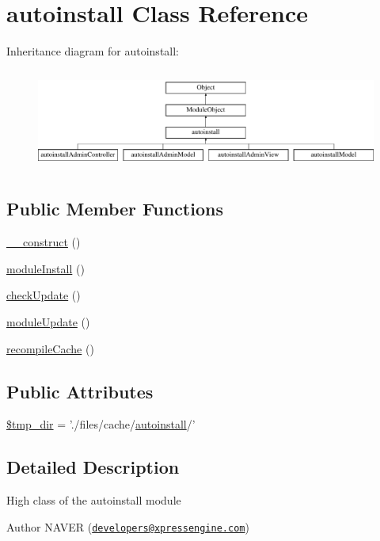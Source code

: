 \hypertarget{classautoinstall}{\section{autoinstall Class Reference}
\label{classautoinstall}
}
Inheritance diagram for autoinstall\-:\begin{figure}[H]
\begin{center}
\leavevmode
\includegraphics[height=3.353293cm]{classautoinstall}
\end{center}
\end{figure}
\subsection*{Public Member Functions}
\begin{DoxyCompactItemize}
\item 
\hyperlink{classautoinstall_af9f001cf682c80b258e5c2bbe8605b86}{\-\_\-\-\_\-construct} ()
\item 
\hyperlink{classautoinstall_ad783aa6031577dca5fdcc7f6ea61f452}{module\-Install} ()
\item 
\hyperlink{classautoinstall_a74f260b0d1254c8e4dbd69b532072a95}{check\-Update} ()
\item 
\hyperlink{classautoinstall_a856f1e61cac8e20ed0df58a6a10f61a8}{module\-Update} ()
\item 
\hyperlink{classautoinstall_a7455962a1f07ea4c4e28971fa8dde715}{recompile\-Cache} ()
\end{DoxyCompactItemize}
\subsection*{Public Attributes}
\begin{DoxyCompactItemize}
\item 
\hyperlink{classautoinstall_a157882a0b8cc81818aa516880f2ba5dc}{\$tmp\-\_\-dir} = './files/cache/\hyperlink{classautoinstall}{autoinstall}/'
\end{DoxyCompactItemize}


\subsection{Detailed Description}
High class of the autoinstall module \begin{DoxyAuthor}{Author}
N\-A\-V\-E\-R (\href{mailto:developers@xpressengine.com}{\tt developers@xpressengine.\-com}) 
\end{DoxyAuthor}


